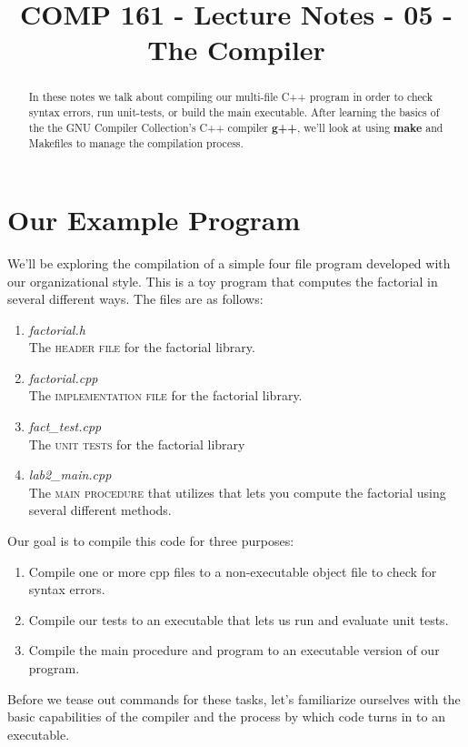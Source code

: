 \documentclass[]{tufte-handout}
\title{COMP 161 - Lecture Notes - 05 - The Compiler}
\begin{document}
 
\maketitle

\begin{abstract}
In these notes we talk about compiling our multi-file C++ program in order to check syntax errors, run unit-tests, or build the main executable. After learning the basics of the the GNU Compiler Collection's C++ compiler \textbf{g++}, we'll look at using \textbf{make} and Makefiles to manage the compilation process.
\end{abstract}

\section{Our Example Program}

We'll be exploring the compilation of a simple four file program developed with our organizational style.  This is a toy program that computes the factorial in several different ways.  The files are as follows:
\begin{enumerate}
\item \textit{factorial.h} \\ The \textsc{header file} for the factorial library.
\item \textit{factorial.cpp} \\ The \textsc{implementation file} for the factorial library.
\item \textit{fact\_test.cpp} \\ The \textsc{unit tests} for the factorial library
\item \textit{lab2\_main.cpp} \\ The \textsc{main procedure} that utilizes that lets you compute the factorial using several different methods.
\end{enumerate}

Our goal is to compile this code for three purposes:
\begin{enumerate}
\item Compile one or more cpp files to a non-executable object file to check for syntax errors.
\item Compile our tests to an executable that lets us run and evaluate unit tests.
\item Compile the main procedure and program to an executable version of our program.  
\end{enumerate}
Before we tease out commands for these tasks, let's familiarize ourselves with the basic capabilities of the compiler and the process by which code turns in to an executable.
\end{document}
